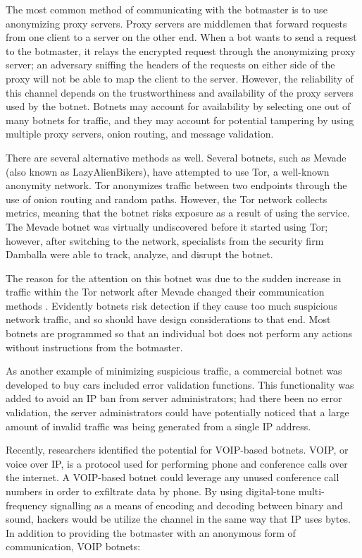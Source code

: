 \documentclass{acm_proc_article-sp}
\begin{document}
The most common method of communicating with the botmaster is to use anonymizing proxy servers.  Proxy servers are middlemen that forward requests from one client to a server on the other end.  When a bot wants to send a request to the botmaster, it relays the encrypted request through the anonymizing proxy server; an adversary sniffing the headers of the requests on either side of the proxy will not be able to map the client to the server.  However, the reliability of this channel depends on the trustworthiness and availability of the proxy servers used by the botnet.  Botnets may account for availability by selecting one out of many botnets for traffic, and they may account for potential tampering by using multiple proxy servers, onion routing, and message validation\cite{stone:p2p}\cite{defcon:prowling}.

There are several alternative methods as well. Several botnets, such as Mevade (also known as LazyAlienBikers), have attempted to use Tor, a well-known anonymity network.  Tor anonymizes traffic between two endpoints through the use of onion routing and random paths.   However, the Tor network collects metrics, meaning that the botnet risks exposure as a result of using the service. The Mevade botnet was virtually undiscovered before it started using Tor; however, after switching to the network, specialists from the security firm Damballa were able to track, analyze, and disrupt the botnet\cite{damballa:tor}. 

The reason for the attention on this botnet was due to the sudden increase in traffic within the Tor network after Mevade changed their communication methods \cite{darkreading:tor}. Evidently botnets risk detection if they cause too much suspicious network traffic, and so should have design considerations to that end. Most botnets are programmed so that an individual bot does not perform any actions without instructions from the botmaster\cite{honeynet:appendix}. 

As another example of minimizing suspicious traffic, a commercial botnet was developed to buy cars included error validation functions\cite{defcon:cars}. This functionality was added to avoid an IP ban from server administrators; had there been no error validation, the server administrators could have potentially noticed that a large amount of invalid traffic was being generated from a single IP address.

Recently, researchers identified the potential for VOIP-based botnets.  VOIP, or voice over IP, is a protocol used for performing phone and conference calls over the internet.  A VOIP-based botnet could leverage any unused conference call numbers in order to exfiltrate data by phone.  By using digital-tone multi-frequency signalling as a means of encoding and decoding between binary and sound, hackers would be utilize the channel in the same way that IP uses bytes.  In addition to providing the botmaster with an anonymous form of communication, VOIP botnets:
\end{document}
